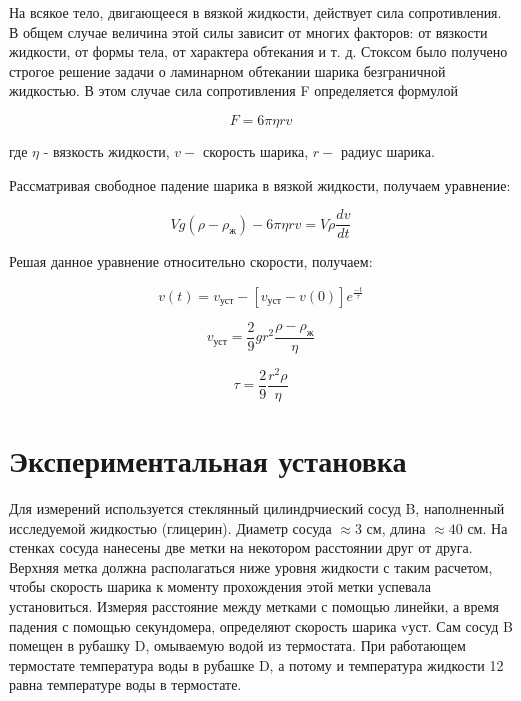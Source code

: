 \documentclass[12pt,a4paper]{article}
\begin{document}
На всякое тело, двигающееся в вязкой жидкости, действует сила сопротивления. В общем случае величина этой силы зависит от многих факторов: от вязкости жидкости, от формы тела, от характера обтекания и т. д. Стоксом было получено строгое решение задачи о ламинарном обтекании шарика безграничной жидкостью. В этом случае сила сопротивления F определяется формулой

\begin{equation}
F = 6\pi \eta rv
\label{eq:Stock's_force}
\end{equation}


где $\eta$ - вязкость жидкости, $v - $ скорость шарика, $r - $ радиус шарика.

Рассматривая свободное падение шарика в вязкой жидкости, получаем уравнение:

\begin{equation}
Vg\left(\rho - \rho_{\text{ж}}\right) - 6\pi \eta rv = V\rho \frac{dv}{dt}
\label{eq:Newton_second_law_for_ball}
\end{equation}


Решая данное уравнение относительно скорости, получаем:

\begin{equation}
v\left(t\right) = v_{\text{уст}} - \left[v_{\text{уст}} - v\left(0\right)\right]e^{\frac{-t}{\tau}}
\label{eq:velocity_equation}
\end{equation}


\begin{equation}
v_{\text{уст}} = \frac{2}{9}gr^{2}\frac{\rho - \rho_{\text{ж}}}{\eta}
\label{eq:velocity_ust_equation}
\end{equation}


\begin{equation}
\tau = \frac{2}{9}\frac{r^{2}\rho}{\eta}
\end{equation}


\section{Экспериментальная установка}

	Для измерений используется стеклянный цилиндрчиеский сосуд B, наполненный исследуемой жидкостью (глицерин). Диаметр сосуда $\approx 3$ см, длина $\approx 40$ см. На стенках сосуда нанесены две метки на некотором расстоянии друг от друга. Верхняя метка должна располагаться ниже уровня жидкости с таким расчетом, чтобы скорость шарика к моменту прохождения этой метки успевала установиться. Измеряя расстояние между метками с помощью линейки, а время падения с помощью секундомера, определяют скорость шарика vуст. Сам сосуд B помещен в рубашку D, омываемую водой из термостата. При работающем термостате температура воды в рубашке D, а потому и температура жидкости 12 равна температуре воды в термостате.
	
\end{document}
